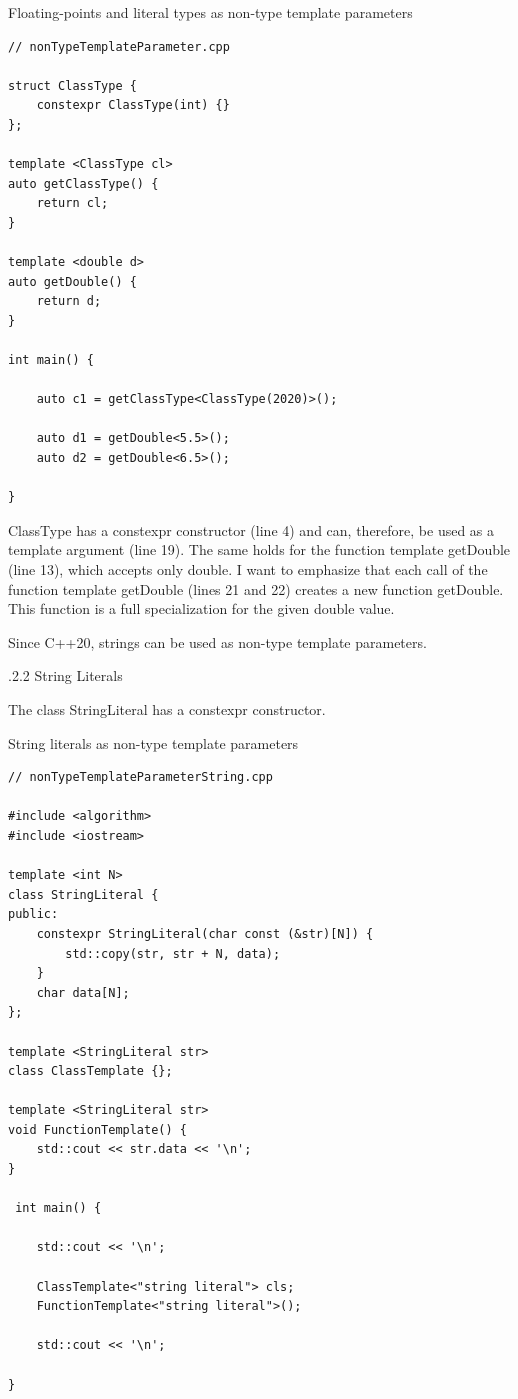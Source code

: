 \noindent
Floating-points and literal types as non-type template parameters
\begin{lstlisting}[style=styleCXX]
// nonTypeTemplateParameter.cpp

struct ClassType {
	constexpr ClassType(int) {}
};

template <ClassType cl>
auto getClassType() {
	return cl;
}

template <double d>
auto getDouble() {
	return d;
}

int main() {

	auto c1 = getClassType<ClassType(2020)>();
	
	auto d1 = getDouble<5.5>();
	auto d2 = getDouble<6.5>();

}
\end{lstlisting}

ClassType has a constexpr constructor (line 4) and can, therefore, be used as a template argument (line 19). The same holds for the function template getDouble (line 13), which accepts only double. I want to emphasize that each call of the function template getDouble (lines 21 and 22) creates a new function getDouble. This function is a full specialization for the given double value.

Since C++20, strings can be used as non-type template parameters.

.2.2\hspace{0.2cm} String Literals

The class StringLiteral has a constexpr constructor.

\noindent
String literals as non-type template parameters
\begin{lstlisting}[style=styleCXX]
// nonTypeTemplateParameterString.cpp

#include <algorithm>
#include <iostream>

template <int N>
class StringLiteral {
public:
	constexpr StringLiteral(char const (&str)[N]) {
		std::copy(str, str + N, data);
	}
	char data[N];
};

template <StringLiteral str>
class ClassTemplate {};

template <StringLiteral str>
void FunctionTemplate() {
	std::cout << str.data << '\n';
}

 int main() {
	
	std::cout << '\n';
	
	ClassTemplate<"string literal"> cls;
	FunctionTemplate<"string literal">();
	
	std::cout << '\n';

}
\end{lstlisting}

